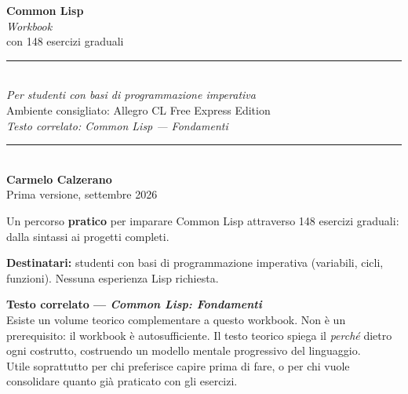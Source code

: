 \documentclass[a4paper,11pt,oneside]{book}
\begin{document}
\begin{titlepage}
  \centering
  \vspace*{3cm}
  {\Huge\bfseries\color{boxEssFrame} Common Lisp}\\[0.6cm]
  {\LARGE\itshape Workbook}\\[0.4cm]
  {\large con 148 esercizi graduali}\\[2cm]
  \rule{0.4\textwidth}{1pt}\\[1cm]
  {\large\itshape Per studenti con basi di programmazione imperativa}\\[0.5cm]
  {\normalsize Ambiente consigliato: Allegro CL Free Express Edition}\\[0.8cm]
  {\small\textcolor{black!50}{\textit{Testo correlato: \textup{Common Lisp — Fondamenti}}}}\\[1.2cm]
  \rule{0.4\textwidth}{0.4pt}\\[0.8cm]
  {\large\textbf{Carmelo Calzerano}}\\[1.5cm]
  {\normalsize Prima versione, settembre 2026}
  \vfill
\end{titlepage}

\thispagestyle{empty}
\vspace*{1.5cm}

\begin{tcolorbox}[
  enhanced,
  colback=boxEssBack,
  colframe=boxEssFrame,
  fonttitle=\bfseries\large,
  title=Scopo del manuale,
  boxrule=0.8pt,
  arc=4pt,
  left=12pt, right=12pt, top=10pt, bottom=10pt
]
Un percorso \textbf{pratico} per imparare Common Lisp attraverso
148 esercizi graduali: dalla sintassi ai progetti completi.

\medskip
\textbf{Destinatari:} studenti con basi di programmazione imperativa
(variabili, cicli, funzioni). Nessuna esperienza Lisp richiesta.
\end{tcolorbox}

\vspace{1.2em}

\begin{tcolorbox}[
  enhanced,
  colback=boxRagBack,
  colframe=boxRagFrame,
  boxrule=0.5pt,
  arc=3pt,
  left=10pt, right=10pt, top=8pt, bottom=8pt
]
\small
\textbf{Testo correlato — \textit{Common Lisp: Fondamenti}}\\[4pt]
Esiste un volume teorico complementare a questo workbook.
Non è un prerequisito: il workbook è autosufficiente.
Il testo teorico spiega il \textit{perché} dietro ogni costrutto,
costruendo un modello mentale progressivo del linguaggio.\\[4pt]
Utile soprattutto per chi preferisce capire prima di fare,
o per chi vuole consolidare quanto già praticato con gli esercizi.
\end{tcolorbox}
\end{document}
